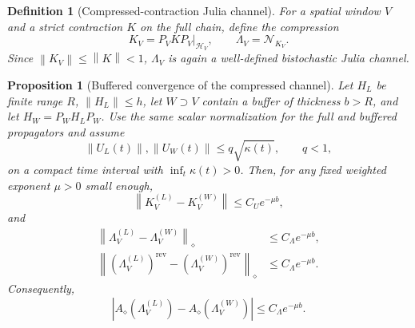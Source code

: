 \documentclass[reprint,amsmath,amssymb,aps,nofootinbib]{revtex4-2}
\newtheorem{definition}{Definition}
\newtheorem{proposition}{Proposition}
\newcommand{\rev}{\mathrm{rev}}
\newcommand{\norm}[1]{\left\lVert #1\right\rVert}
\begin{document}
\begin{definition}[Compressed-contraction Julia channel]
For a spatial window $V$ and a strict contraction $K$ on the full chain, define the compression
\begin{equation}
K_V=P_VKP_V|_{\mathcal H_V},
\qquad
\Lambda_V=\mathcal N_{K_V}.
\end{equation}
Since $\norm{K_V}\le\norm K<1$, $\Lambda_V$ is again a well-defined bistochastic Julia channel.
\end{definition}

\begin{proposition}[Buffered convergence of the compressed channel]
Let $H_L$ be finite range $R$, $\norm{H_L}\le h$, let $W\supset V$ contain a buffer of thickness
$b>R$, and let $H_W=P_WH_LP_W$. Use the same scalar normalization for the full and buffered
propagators and assume
\begin{equation}
\norm{U_L(t)},\norm{U_W(t)}\le q\sqrt{\kappa(t)},
\qquad q<1,
\end{equation}
on a compact time interval with $\inf_t\kappa(t)>0$. Then, for any fixed weighted exponent
$\mu>0$ small enough,
\begin{equation}
\boxed{\norm{K_V^{(L)}-K_V^{(W)}}\le C_Ue^{-\mu b},}
\end{equation}
and
\begin{equation}
\boxed{\begin{aligned}
\norm{\Lambda_V^{(L)}-\Lambda_V^{(W)}}_\diamond
&\le C_\Lambda e^{-\mu b},\\
\norm{(\Lambda_V^{(L)})^{\rev}-(\Lambda_V^{(W)})^{\rev}}_\diamond
&\le C_\Lambda e^{-\mu b}.
\end{aligned}}
\end{equation}
Consequently,
\begin{equation}
\boxed{
|A_\diamond(\Lambda_V^{(L)})-A_\diamond(\Lambda_V^{(W)})|
\le C_\Lambda e^{-\mu b}.}
\end{equation}
\end{proposition}
\end{document}
